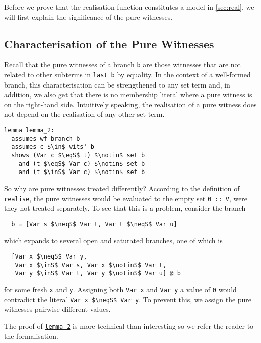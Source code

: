 \documentclass[sigplan,10pt,anonymous,review]{acmart}
\newcommand{\inS}{\in_\text{s}}
\newcommand{\notinS}{\notin_\text{s}}
\newcommand{\eqS}{=_\text{s}}
\newcommand{\neqS}{\neq_\text{s}}
\begin{document}
Before we prove that the realisation function constitutes a model in \autoref{sec:real}, we will first explain the significance of the pure witnesses.

\subsection{Characterisation of the Pure Witnesses\label{sec:pwits}}
Recall that the pure witnesses of a branch \lstinline!b! are those witnesses that are not related to other subterms in \lstinline!last b! by equality.
In the context of a well-formed branch, this characterisation can be strengthened to any set term and, in addition, we also get that there is no membership literal where a pure witness is on the right-hand side.
Intuitively speaking, the realisation of a pure witness does not depend on the realisation of any other set term.
\begin{lstlisting}[label={lst:lemma_2}]
lemma lemma_2:
  assumes wf_branch b
  assumes c $\in$ wits' b
  shows (Var c $\eqS$ t) $\notin$ set b
    and (t $\eqS$ Var c) $\notin$ set b
    and (t $\inS$ Var c) $\notin$ set b
\end{lstlisting}
So why are pure witnesses treated differently?
According to the definition of \lstinline!realise!, the pure witnesses would be evaluated to the empty set \lstinline!0 :: V!, were they not treated separately. 
To see that this is a problem, consider the branch
\begin{lstlisting}
  b = [Var s $\neqS$ Var t, Var t $\neqS$ Var u]
\end{lstlisting}
which expands to several open and saturated branches, one of which is
\begin{lstlisting}
  [Var x $\neqS$ Var y,
   Var x $\inS$ Var s, Var x $\notinS$ Var t,
   Var y $\inS$ Var t, Var y $\notinS$ Var u] @ b
\end{lstlisting}
for some fresh \lstinline!x! and \lstinline!y!.
Assigning both \lstinline!Var x! and \lstinline!Var y! a value of \lstinline!0! would contradict the literal \lstinline!Var x $\neqS$ Var y!.
To prevent this, we assign the pure witnesses pairwise different values.

The proof of \hyperref[lst:lemma_2]{\lstinline!lemma_2!} is more technical than interesting so we refer the reader to the formalisation.
\end{document}
